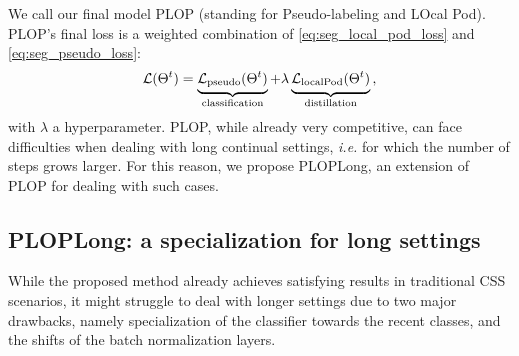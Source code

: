 We call our final model PLOP (standing for Pseudo-labeling and LOcal Pod). PLOP's final loss is a
weighted combination of \autoref{eq:seg_local_pod_loss} and \autoref{eq:seg_pseudo_loss}:
%
\begin{equation}
    \mathcal{L}(\Theta^t) = \underbrace{\strut \mathcal{L}_\text{pseudo}(\Theta^t)}_\text{classification} + \lambda\underbrace{\strut \mathcal{L}_\text{localPod}(\Theta^t)}_\text{distillation}\,,
    \label{eq:seg_complete_loss}
\end{equation}
%
\noindent with $\lambda$ a hyperparameter. PLOP, while already very competitive, can face
difficulties when dealing with long continual settings, \textit{i.e.} for which the number of steps
grows larger. For this reason, we propose PLOPLong, an extension of PLOP for dealing with such
cases.

\subsection{PLOPLong: a specialization for long settings}\label{sec:seg_plopv2}

While the proposed method already achieves satisfying results in traditional \ac{CSS} scenarios, it
might struggle to deal with longer settings due to two major drawbacks, namely specialization of the
classifier towards the recent classes, and the shifts of the batch normalization layers.

